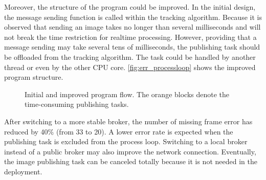 Moreover, the structure of the program could be improved. In the initial design, the message sending function is called within the tracking algorithm. Because it is observed that sending an image takes no longer than several milliseconds and will not break the time restriction for realtime processing. However, providing that a message sending may take several tens of milliseconds, the publishing task should be offloaded from the tracking algorithm. The task could be handled by another thread or even by the other CPU core. \autoref{fig:err_processloop} shows the improved program structure.
\begin{figure}
  \centering
    \qquad
    \caption{Initial and improved program flow. The orange blocks denote the time-consuming publishing tasks.}%
    \label{fig:err_processloop}
\end{figure}

After switching to a more stable broker, the number of missing frame error has reduced by 40\% (from 33 to 20). A lower error rate is expected when the publishing task is excluded from the process loop. Switching to a local broker instead of a public broker may also improve the network connection. Eventually, the image publishing task can be canceled totally because it is not needed in the deployment.

